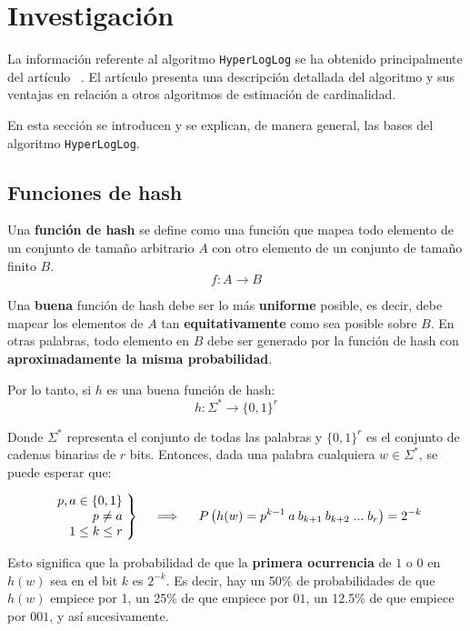% 
\section{Investigación}

La información referente al algoritmo \texttt{HyperLogLog} se ha obtenido principalmente
del artículo  ~\cite{hll:HyperLogLog}.
El artículo presenta una descripción detallada del algoritmo y sus ventajas en relación a otros
algoritmos de estimación de cardinalidad.

En esta sección se introducen y se explican, de manera general, las bases del algoritmo \texttt{HyperLogLog}.

\subsection{Funciones de hash}
\label{hash}

Una \textbf{función de hash} se define como una función que mapea todo elemento de un
conjunto de tamaño arbitrario $A$ con otro elemento de un conjunto de tamaño finito $B$.
$$f: A \rightarrow B$$

Una \textbf{buena} función de hash debe ser lo más \textbf{uniforme} posible, es decir, debe mapear los elementos de
$A$ tan \textbf{equitativamente} como sea posible sobre $B$. En otras palabras, todo elemento en $B$ debe ser generado
por la función de hash con \textbf{aproximadamente la misma probabilidad}.

Por lo tanto, si $h$ es una buena función de hash:
$$h: \Sigma^* \rightarrow \{0,1\}^r$$

Donde $\Sigma^*$ representa el conjunto de todas las palabras y $\{0, 1\}^r$ es el conjunto de cadenas binarias de $r$ bits.
Entonces, dada una palabra cualquiera $w \in \Sigma^*$, se puede esperar que:

\begin{align*}
  \left.\begin{array}{r@{\mskip\thickmuskip}l}
    p, a \in \{0, 1\} \\
    p \neq a \\
    1 \leq k \leq r
  \end{array} \right\}
  \quad \implies \quad
  \left.
    P\left( h(w) = p^{k-1} \: a \: b_{k+1} \: b_{k+2} \; ... \; b_r \right) = 2^{-k}
  \right.
\end{align*}

Esto significa que la probabilidad de que la \textbf{primera ocurrencia} de $1$ o $0$ en $h(w)$ sea en el bit $k$ es $2^{-k}$.
Es decir, hay un 50\% de probabilidades de que $h(w)$ empiece por 1, un 25\% de que empiece por $01$, un 12.5\% de que
empiece por $001$, y así sucesivamente.

